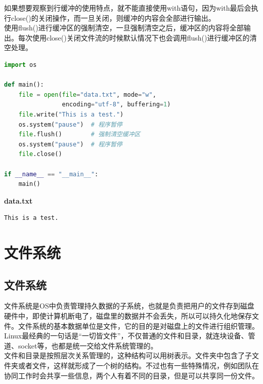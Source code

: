 如果想要观察到行缓冲的使用特点，就不能直接使用with语句，因为with最后会执行close()的关闭操作，而一旦关闭，则缓冲的内容会全部进行输出。\\

使用flush()进行缓冲区的强制清空，一旦强制清空之后，缓冲区的内容将全部输出。每次使用close()关闭文件流的时候默认情况下也会调用flush()进行缓冲区的清空处理。\\


\begin{lstlisting}[language=Python]
import os

def main():
    file = open(file="data.txt", mode="w",
                encoding="utf-8", buffering=1)
    file.write("This is a test.")
    os.system("pause")  # 程序暂停
    file.flush()        # 强制清空缓冲区
    os.system("pause")  # 程序暂停
    file.close()

if __name__ == "__main__":
    main()
\end{lstlisting}

\begin{tcolorbox}
    \textbf{data.txt}
    \begin{verbatim}
This is a test.
	\end{verbatim}
\end{tcolorbox}

\newpage

\section{文件系统}

\subsection{文件系统}

文件系统是OS中负责管理持久数据的子系统，也就是负责把用户的文件存到磁盘硬件中，即使计算机断电了，磁盘里的数据并不会丢失，所以可以持久化地保存文件。文件系统的基本数据单位是文件，它的目的是对磁盘上的文件进行组织管理。\\

Linux最经典的一句话是``一切皆文件”，不仅普通的文件和目录，就连块设备、管道、socket等，也都是统一交给文件系统管理的。\\

文件和目录是按照层次关系管理的，这种结构可以用树表示。文件夹中包含了子文件夹或者文件，这样就形成了一个树的结构。不过也有一些特殊情况，例如团队在协同工作时会共享一些信息，两个人有着不同的目录，但是可以共享同一份文件。\\

